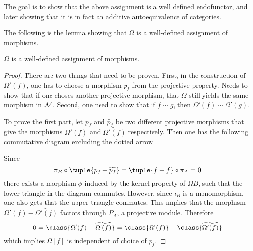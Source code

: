 The goal is to show that the above assignment is a well defined endofunctor, and later showing that it is in fact an additive autoequivalence of categories.

The following is the lemma showing that \( \Omega \) is a well-defined assignment of morphisms.

\begin{lemma}
    \label{lem:stmod_omega_f_is_well_defined}
    \( \Omega \) is a well-defined assignment of morphisms.
\end{lemma}
\begin{proof}
    There are two things that need to be proven. First, in the construction of \( \Omega'(f) \), one has to choose a morphism \( p_f \) from the projective property. Needs to show that if one choses another projective morphism, that \( \Omega \) still yields the same morphism in \( {\mathcal{M}} \). Second, one need to show that if \( f \sim g \), then \( \Omega'(f) \sim \Omega'(g) \).

    To prove the first part, let \( p_f \) and \( \widetilde{p_f} \) be two different projective morphisms that give the morphisms \( \Omega'(f) \) and \( \widetilde{\Omega'(f)} \) respectively. Then one has the following commutative diagram excluding the dotted arrow
    \begin{center}
    \end{center}

    Since
    \[
        \pi_B \circ \tuple{p_f - \widetilde{p_f}} = \tuple{f - f} \circ \pi_A = 0
    \]
    there exists a morphism \( \phi \) induced by the kernel property of \( \Omega B \), such that the lower triangle in the diagram commutes. However, since \( \iota_B \) is a monomorphism, one also gets that the upper triangle commutes. This implies that the morphism \( \Omega'(f) - \widetilde{\Omega'(f)} \) factors through \( P_A \), a projective module. Therefore
    \[
        0 = \class{\Omega'(f) - \widetilde{\Omega'(f)}} = \class{\Omega'(f)} - \class{\widetilde{\Omega'(f)}}
    \]
    which implies \( \Omega [f] \) is independent of choice of \( p_f \).


\end{proof}
